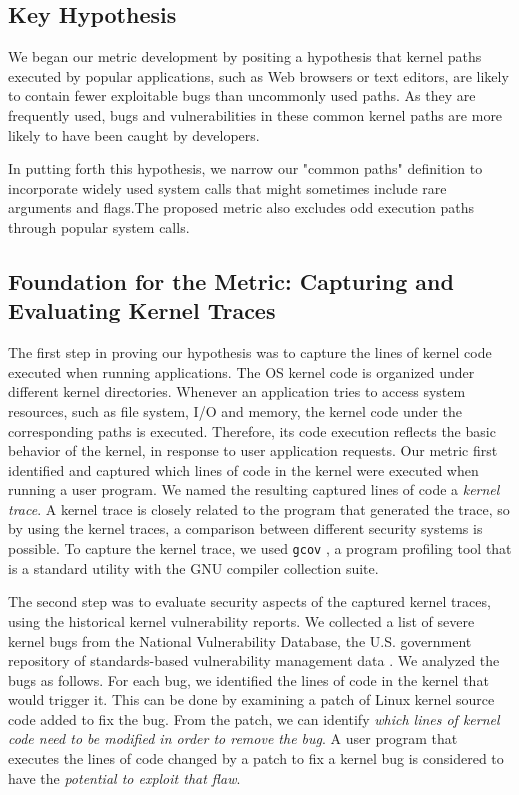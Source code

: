 

\subsection{Key Hypothesis}

We began our metric development by positing a hypothesis
that kernel paths executed by popular applications, such as Web browsers or
text editors, are likely to contain fewer exploitable bugs than uncommonly used paths.
As they are frequently used, bugs and vulnerabilities in these common kernel
paths are more likely to have
been caught by developers.

In putting forth this hypothesis, we narrow our "common paths" definition
to incorporate widely used system calls that might sometimes include rare arguments
and flags.The proposed metric also excludes odd execution paths through popular
system calls.

\subsection{Foundation for the Metric: Capturing and Evaluating Kernel Traces}

The first step in proving our hypothesis was to capture the lines of kernel
code executed
when running applications. The OS kernel code is organized under different
kernel directories.
Whenever an application tries to access system resources, such as file
system, I/O and memory, the kernel code under the corresponding paths is executed. Therefore,
its code execution reflects the basic behavior of the kernel, in response
to user application requests.
Our metric first identified and captured which lines of code in the kernel
were executed
when running a user program. We named the resulting captured lines of
code a \textit{kernel trace}.
A kernel trace is closely related to the program that generated the trace, so
by using the kernel traces, a comparison between different
security systems is possible.
To capture the kernel trace, we used \texttt{gcov} \cite{gcov}, a program profiling
tool that is a standard utility with the GNU compiler collection
suite.


The second step was to evaluate security aspects of the captured kernel traces,%
using the historical kernel vulnerability reports. We collected a list of
severe kernel bugs from
the National Vulnerability Database, the U.S. government repository of
standards-based vulnerability management data \cite{NVD}. We analyzed the bugs as
follows. For each bug, we identified the lines of code
in the kernel that would trigger it. This can be done by examining
a patch of Linux kernel source code added to fix the bug. From the patch,
we can identify \textit{which lines of kernel code need to be modified in order to
remove the bug}.
A user program that executes the lines of code changed by a patch to fix a
kernel bug is considered to have the \textit{potential to exploit that flaw}.

